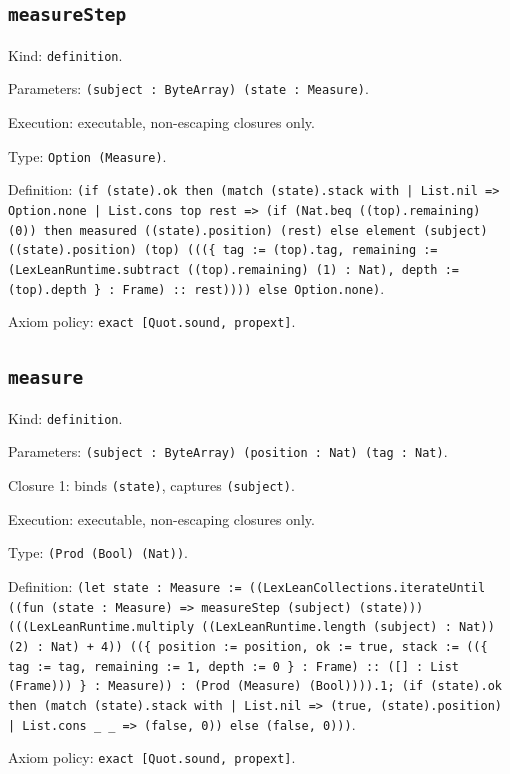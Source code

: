 \documentclass[11pt]{article}
\begin{document}
\subsection*{\texttt{measureStep}}
\noindent Kind: \texttt{definition}.\par
\noindent Parameters: \texttt{(subject : ByteArray) (state : Measure)}.\par
\noindent Execution: executable, non-escaping closures only.\par
\noindent Type: \texttt{Option (Measure)}.\par
\noindent Definition: \texttt{(if (state).ok then (match (state).stack with | List.nil => Option.none | List.cons top rest => (if (Nat.beq ((top).remaining) (0)) then measured ((state).position) (rest) else element (subject) ((state).position) (top) (((\{ tag := (top).tag, remaining := (LexLeanRuntime.subtract ((top).remaining) (1) : Nat), depth := (top).depth \} : Frame) :: rest)))) else Option.none)}.\par
\noindent Axiom policy: \texttt{exact [Quot.sound, propext]}.\par
\subsection*{\texttt{measure}}
\noindent Kind: \texttt{definition}.\par
\noindent Parameters: \texttt{(subject : ByteArray) (position : Nat) (tag : Nat)}.\par
\noindent Closure 1: binds \texttt{(state)}, captures \texttt{(subject)}.\par
\noindent Execution: executable, non-escaping closures only.\par
\noindent Type: \texttt{(Prod (Bool) (Nat))}.\par
\noindent Definition: \texttt{(let state : Measure := ((LexLeanCollections.iterateUntil ((fun (state : Measure) => measureStep (subject) (state))) (((LexLeanRuntime.multiply ((LexLeanRuntime.length (subject) : Nat)) (2) : Nat) + 4)) ((\{ position := position, ok := true, stack := ((\{ tag := tag, remaining := 1, depth := 0 \} : Frame) :: ([] : List (Frame))) \} : Measure)) : (Prod (Measure) (Bool)))).1; (if (state).ok then (match (state).stack with | List.nil => (true, (state).position) | List.cons \_ \_ => (false, 0)) else (false, 0)))}.\par
\noindent Axiom policy: \texttt{exact [Quot.sound, propext]}.\par
\end{document}
